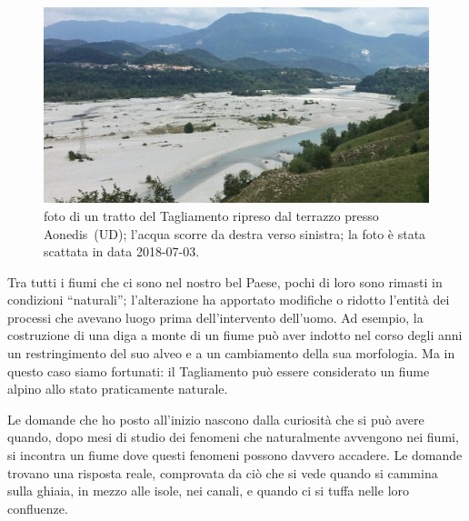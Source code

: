 \begin{figure}
	\centering
	\includegraphics[width=\textwidth]{files/foto_terrazzo_valle_pinzano.jpg}
	\caption[foto di un tratto del Tagliamento ripreso dal terrazzo presso Aonedis~(UD)]{foto di un tratto del Tagliamento ripreso dal terrazzo presso Aonedis~(UD); l'acqua scorre da destra verso sinistra; la foto è stata scattata in data 2018-07-03. 
	}
	\label{fig:foto-pinzano}
\end{figure}


Tra tutti i fiumi che ci sono nel nostro bel Paese, pochi di loro sono rimasti in condizioni “naturali”; l'alterazione ha apportato modifiche o ridotto l'entità dei processi che avevano luogo prima dell'intervento dell'uomo. 
Ad esempio, la costruzione di una diga a monte di un fiume può aver indotto nel corso degli anni un restringimento del suo alveo e a un cambiamento della sua morfologia.
Ma in questo caso siamo fortunati: il Tagliamento può essere considerato un fiume alpino allo stato praticamente naturale.

Le domande che ho posto all'inizio nascono dalla curiosità che si può avere quando, dopo mesi di studio dei fenomeni che naturalmente avvengono nei fiumi, si incontra un fiume dove questi fenomeni possono davvero accadere. Le domande trovano una risposta reale, comprovata da ciò che si vede quando si cammina sulla ghiaia, in mezzo alle isole, nei canali, e quando ci si tuffa nelle loro confluenze.

